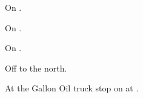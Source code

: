 
\begin{LocationList}

On .

On  .

On  .

Off   to the north.

At the Gallon Oil truck stop on  at .

\end{LocationList}
